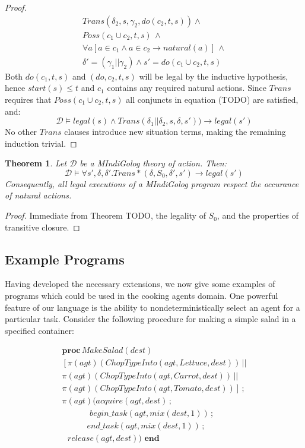 \documentclass[letterpaper]{article}
\newtheorem{theorem}{Theorem}
\begin{document}
\begin{proof}
\begin{multline*}
Trans(\delta_{2},s,\gamma_{2},do(c_{2},t,s))\wedge\\
Poss(c_{1}\cup c_{2},t,s)\,\wedge\\
\forall a\left[a\in c_{1}\wedge a\in c_{2}\rightarrow natural(a)\right]\,\wedge\\
\delta'=(\gamma_{1}||\gamma_{2})\wedge s'=do(c_{1}\cup c_{2},t,s)
\end{multline*}
Both $do(c_1,t,s)$ and $(do,c_2,t,s)$ will be legal by the inductive hypothesis,
hence $start(s) \leq t$ and $c_1$ contains any required natural actions.
Since $Trans$ requires that $Poss(c_1 \cup c_2,t,s)$ all conjuncts in
equation (TODO) are satisfied, and:
\begin{equation*}
\mathcal{D} \models legal(s) \wedge Trans(\delta_1 || \delta_2,s,\delta,s'))
\rightarrow legal(s')
\end{equation*}
No other $Trans$ clauses introduce new situation terms, making
the remaining induction trivial.
\end{proof}


\begin{theorem}
Let $\mathcal{D}$ be a MIndiGolog theory of action. Then:
\begin{equation*}
\mathcal{D} \models \forall s',\delta,\delta'. Trans*(\delta,S_0,\delta',s')
\rightarrow legal(s')
\end{equation*}
Consequently, all legal executions of a MIndiGolog program respect
the occurance of natural actions.
\end{theorem}

\begin{proof}
Immediate from Theorem TODO, the legality of $S_0$, and the properties
of transitive closure.
\end{proof}


\subsection{Example Programs}

Having developed the necessary extensions, we now give some examples
of programs which could be used in the cooking agents domain. One
powerful feature of our language is the ability to nondeterministically
select an agent for a particular task. Consider the following procedure
for making a simple salad in a specified container:

\[
\begin{array}{c}
\mathbf{proc}\, MakeSalad(dest)\\
\left[\pi(agt)(ChopTypeInto(agt,Lettuce,dest))\,||\right.\\
\pi(agt)(ChopTypeInto(agt,Carrot,dest))\,||\\
\left.\pi(agt)(ChopTypeInto(agt,Tomato,dest))\right]\,;\\
\pi(agt)(acquire(agt,dest)\,;\\
\,\,\,\,\,\,\,\,\,\,\,\,\,\,\,\,\,\,\,\, begin\_ task(agt,mix(dest,1))\,;\\
\,\,\,\,\,\,\,\,\,\,\,\,\,\,\,\,\,\, end\_ task(agt,mix(dest,1))\,;\\
\,\,\,\, release(agt,dest))\,\,\mathbf{end}\end{array}\]
\end{document}
